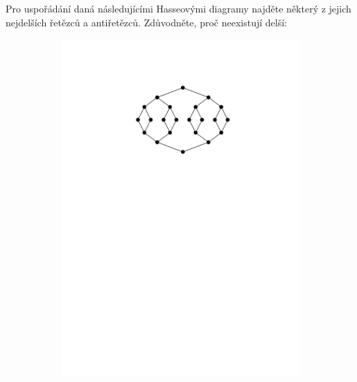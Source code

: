 \documentclass[10pt]{article}
\begin{document}
\begin{problem}
Pro uspořádání daná následujícími Hasseovými diagramy najděte některý z jejich nejdelších řetězců a antiřetězců. Zdůvodněte, proč neexistují delší:

\begin{figure}[h]
    \centering
    \begin{subfigure}[c]{4.5cm}
        \includegraphics[width=\textwidth]{hasse1.pdf}
    \end{subfigure}
    \hspace{5cm}
    \begin{subfigure}[c]{2.3cm}

\end{subfigure}
\end{figure}
\end{problem}
\end{document}
